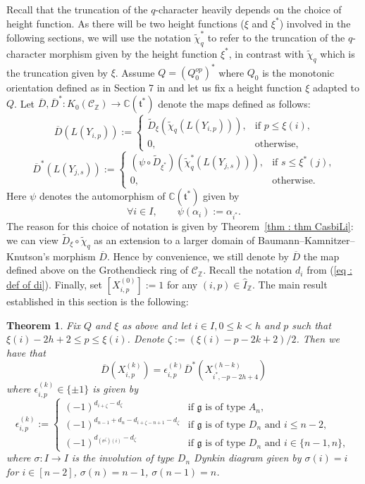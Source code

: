 \documentclass[12pt]{amsart}
\theoremstyle{plain}
\newtheorem{theorem}{Theorem}[section]
\theoremstyle{definition}
\numberwithin{equation}{section}
\newcommand{\tchi}{{\widetilde{\chi}}}
\newcommand{\td}{{\widetilde{D}}}
\newcommand{\IZ}{\widehat{I}_{\mathbb{Z}}}
\newcommand{\tdxi}{\widetilde{D}_{\xi}}
\newcommand{\barD}{\overline{D}}
\newcommand{\barDstar}{\overline{D}^{*}}
\newcommand{\CZ}{\mathcal{C}_{\mathbb{Z}}}
\newcommand{\xistar}{\xi^{*}}
\begin{document}
 Recall that the truncation of the $q$-character heavily depends on the choice of height function. As there will be two height functions ($\xi$ and $\xistar$) involved in the following sections, we will use the notation $\tchi_q^{*}$ to refer to the truncation of the $q$-character morphism given by the height function $\xistar$, in contrast with $\tchi_q$ which is the truncation given by $\xi$. Assume $Q = (Q_{0}^{op})^{*}$ where $Q_0$ is the monotonic orientation defined as in Section 7 in \cite{CasbiLi}  and let us fix a height function $\xi$ adapted to $Q$. Let $\barD , \barDstar : K_0(\CZ) \longrightarrow \mathbb{C}(\mathfrak{t}^{*})$ denote the maps defined as follows:
  $$ \barD (L(Y_{i,p})) := 
  \begin{cases}
   \td_{\xi}( \tchi_q(L(Y_{i,p}))), & \text{if $p \leq \xi(i)$,} \\
   0, & \text{otherwise,}
   \end{cases}
   $$
  $$ \barD^{*} (L(Y_{j,s})) := 
  \begin{cases}
  \left( \psi \circ  \td_{\xi^{*}} \right)( \tchi_q^{*}(L(Y_{j,s}))), & \text{if $s \leq \xi^{*}(j)$,} \\
   0, & \text{otherwise.}
   \end{cases}
   $$
   Here $\psi$ denotes the automorphism of $\mathbb{C}(\mathfrak{t}^{*})$ given by 
 $$ \forall i \in I, \qquad  \psi(\alpha_i) := \alpha_{i^{*}} .  $$
 The reason for this choice of notation is given by Theorem~\ref{thm : thm CasbiLi}: we can view  $\tdxi \circ \tchi_q$ as an extension to a larger domain of Baumann--Kamnitzer--Knutson's morphism $\barD$. Hence by convenience, we still denote by $\barD$ the map defined above on the Grothendieck ring of $\CZ$. 
Recall the notation $d_i$ from (\ref{eq : def of di}). Finally, set $[X_{i,p}^{(0)}] := 1$ for any $(i,p) \in \IZ$. The main result established in this section is the following:
 \begin{theorem} \label{thm : duality between KRs}
  Fix $Q$ and $\xi$ as above and let $i \in I, 0 \leq k < h$ and $p$ such that $\xi(i)-2h+2 \leq p \leq \xi(i)$. Denote $\zeta := (\xi(i)-p-2k+2)/2$. Then we have that
\begin{equation} \label{eq : thm duality between KRs}
    \barD \left( X_{i,p}^{(k)} \right)  = \epsilon_{i,p}^{(k)} \barDstar \left(  X_{i^{*}, -p-2h+4}^{(h-k)}  \right)  
\end{equation}
where $\epsilon_{i,p}^{(k)} \in \{\pm 1\}$ is given by 
$$\epsilon_{i,p}^{(k)}:= 
\begin{cases}
   (-1)^{d_{i+\zeta}-d_{\zeta}} & \text{if $\mathfrak{g}$ is of type $A_n$,} \\
    (-1)^{d_{n-1}+d_n-d_{i+\zeta-n+1}-d_\zeta} & \text{if $\mathfrak{g}$ is of type $D_n$ and $i \leq n-2$,} \\
    (-1)^{d_{(\sigma^{\zeta})(i)}-d_{\zeta}} & \text{if $\mathfrak{g}$ is of type $D_n$ and $i \in \{n-1,n\}$,  }
    \end{cases}
 $$ 
where $\sigma: I \to I$ is the involution of type $D_n$ Dynkin diagram given by $\sigma(i)=i$ for $i \in [n-2]$, $\sigma(n)=n-1$, $\sigma(n-1)=n$. 
\end{theorem}
\end{document}

